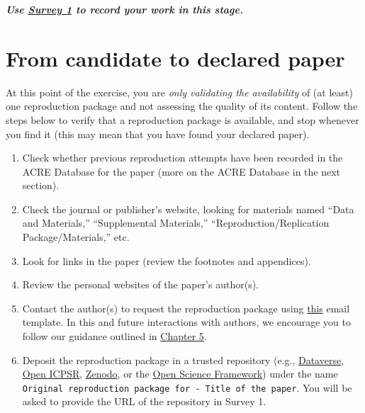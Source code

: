 \documentclass[]{book}
\providecommand{\tightlist}{%
  \setlength{\itemsep}{0pt}\setlength{\parskip}{0pt}}
\begin{document}
\textbf{\emph{Use \href{https://berkeley.qualtrics.com/jfe/form/SV_2bO83uJvU9ZiTXv}{Survey 1} to record your work in this stage.}}

\hypertarget{declare}{%
\section{From candidate to declared paper}\label{declare}}

At this point of the exercise, you are \emph{only validating the availability} of (at least) one reproduction package and not assessing the quality of its content. Follow the steps below to verify that a reproduction package is available, and stop whenever you find it (this may mean that you have found your declared paper).

\begin{enumerate}
\def\labelenumi{\arabic{enumi}.}
\tightlist
\item
  Check whether previous reproduction attempts have been recorded in the ACRE Database for the paper (more on the ACRE Database in the next section).
\item
  Check the journal or publisher's website, looking for materials named ``Data and Materials,'' ``Supplemental Materials,'' ``Reproduction/Replication Package/Materials,'' etc.\\
\item
  Look for links in the paper (review the footnotes and appendices).\\
\item
  Review the personal websites of the paper's author(s).
\item
  Contact the author(s) to request the reproduction package using \href{https://bitss.github.io/ACRE/guidance-for-a-constructive-exchange-between-reproducers-and-original-authors.html\#contacting-the-original-authors-when-there-is-no-reproduction-package}{this} email template. In this and future interactions with authors, we encourage you to follow our guidance outlined in \href{https://bitss.github.io/ACRE/guidance-for-a-constructive-exchange-between-reproducers-and-original-authors.html\#contacting-the-original-authors-when-there-is-no-reproduction-package}{Chapter 5}.
\item
  Deposit the reproduction package in a trusted repository (e.g., \href{https://dataverse.org/}{Dataverse}, \href{https://www.openicpsr.org/openicpsr/}{Open ICPSR}, \href{https://zenodo.org/}{Zenodo}, or the \href{https://osf.io/}{Open Science Framework}) under the name \texttt{Original\ reproduction\ package\ for\ -\ Title\ of\ the\ paper}. You will be asked to provide the URL of the repository in Survey 1.
\end{enumerate}
\end{document}
